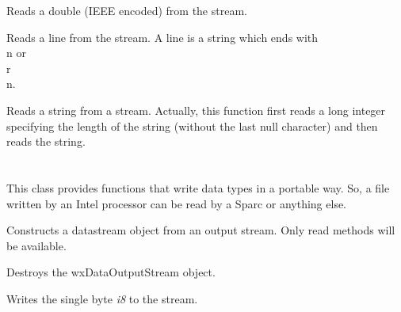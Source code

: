 Reads a double (IEEE encoded) from the stream.



Reads a line from the stream. A line is a string which ends with \\n or \\r\\n.



Reads a string from a stream. Actually, this function first reads a long integer
specifying the length of the string (without the last null character) and then
reads the string.

\section{}\label{wxdataoutputstream}

This class provides functions that write data types in a
portable way. So, a file written by an Intel processor can be read by a
Sparc or anything else.


\label{wxdataoutputstreamconstr}


Constructs a datastream object from an output stream. Only read methods will
be available.





Destroys the wxDataOutputStream object.



Writes the single byte {\it i8} to the stream.


